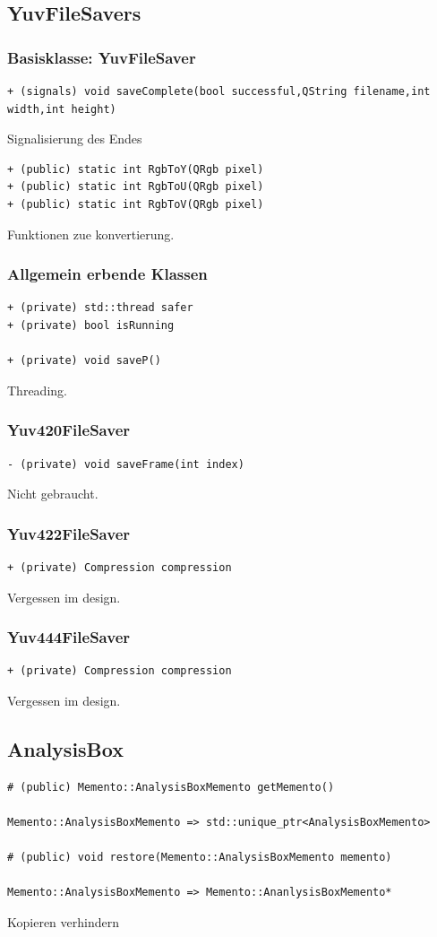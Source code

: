 \documentclass[parskip=full]{scrartcl}
\begin{document}
\subsection{YuvFileSavers}
\subsubsection{Basisklasse: YuvFileSaver}
\begin{verbatim}
+ (signals) void saveComplete(bool successful,QString filename,int width,int height)
\end{verbatim}
Signalisierung des Endes
\begin{verbatim}
+ (public) static int RgbToY(QRgb pixel)
+ (public) static int RgbToU(QRgb pixel)
+ (public) static int RgbToV(QRgb pixel)
\end{verbatim}
Funktionen zue konvertierung.
\subsubsection{Allgemein erbende Klassen}
\begin{verbatim}
+ (private) std::thread safer
+ (private) bool isRunning

+ (private) void saveP()
\end{verbatim}
Threading.
\subsubsection{Yuv420FileSaver}
\begin{verbatim}
- (private) void saveFrame(int index)
\end{verbatim}
Nicht gebraucht.
\subsubsection{Yuv422FileSaver}
\begin{verbatim}
+ (private) Compression compression
\end{verbatim}
Vergessen im design.
\subsubsection{Yuv444FileSaver}
\begin{verbatim}
+ (private) Compression compression
\end{verbatim}
Vergessen im design.
\subsection{AnalysisBox}
\begin{verbatim}
# (public) Memento::AnalysisBoxMemento getMemento()

Memento::AnalysisBoxMemento => std::unique_ptr<AnalysisBoxMemento>

# (public) void restore(Memento::AnalysisBoxMemento memento)

Memento::AnalysisBoxMemento => Memento::AnanlysisBoxMemento*
\end{verbatim}
Kopieren verhindern
\end{document}
